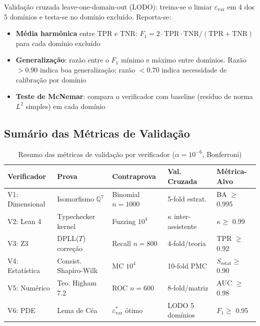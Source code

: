 \documentclass[5p]{elsarticle}
\theoremstyle{remark}
\begin{document}
Validação cruzada leave-one-domain-out (LODO): treina-se o limiar $\varepsilon_{\text{var}}$ em 4 dos 5 domínios e testa-se no domínio excluído. Reporta-se:

\begin{itemize}
    \item \textbf{Média harmônica} entre TPR e TNR: $F_1 = 2 \cdot \text{TPR} \cdot \text{TNR} / (\text{TPR} + \text{TNR})$ para cada domínio excluído
    \item \textbf{Generalização}: razão entre o $F_1$ mínimo e máximo entre domínios. Razão $> 0.90$ indica boa generalização; razão $< 0.70$ indica necessidade de calibração por domínio
    \item \textbf{Teste de McNemar}: compara o verificador com baseline (resíduo de norma $L^2$ simples) em cada domínio
\end{itemize}

\subsection{Sumário das Métricas de Validação}

\begin{table}[htbp]
\centering
\caption{Resumo das métricas de validação por verificador ($\alpha = 10^{-6}$, Bonferroni)}
\label{tab:validacao_resumo}
\begin{tabular}{L{2cm} L{2.2cm} L{2.2cm} L{2.2cm} L{2.2cm}}
\toprule
\textbf{Verificador} & \textbf{Prova} & \textbf{Contraprova} & \textbf{Val. Cruzada} & \textbf{Métrica-Alvo} \\
\midrule
V1: Dimensional & Isomorfismo $\mathbb{Q}^7$ & Binomial $n{=}1000$ & 5-fold estrat. & BA $\geq$ 0.995 \\
V2: Lean 4 & Typechecker kernel & Fuzzing $10^4$ & $\kappa$ inter-assistente & $\kappa \geq$ 0.99 \\
V3: Z3 & DPLL($T$) correção & Recall $n{=}800$ & 4-fold/teoria & TPR $\geq$ 0.92 \\
V4: Estatística & Consist. Shapiro-Wilk & MC $10^4$ & 10-fold PMC & $S_{\text{estat}} \geq$ 0.90 \\
V5: Numérico & Teo. Higham 7.2 & ROC $n{=}600$ & 8-fold/matriz & AUC $\geq$ 0.98 \\
V6: PDE & Lema de Céa & $\varepsilon_{\text{var}}^*$ ótimo & LODO 5 domínios & $F_1 \geq$ 0.95 \\
\bottomrule
\end{tabular}
\end{table}
\end{document}
